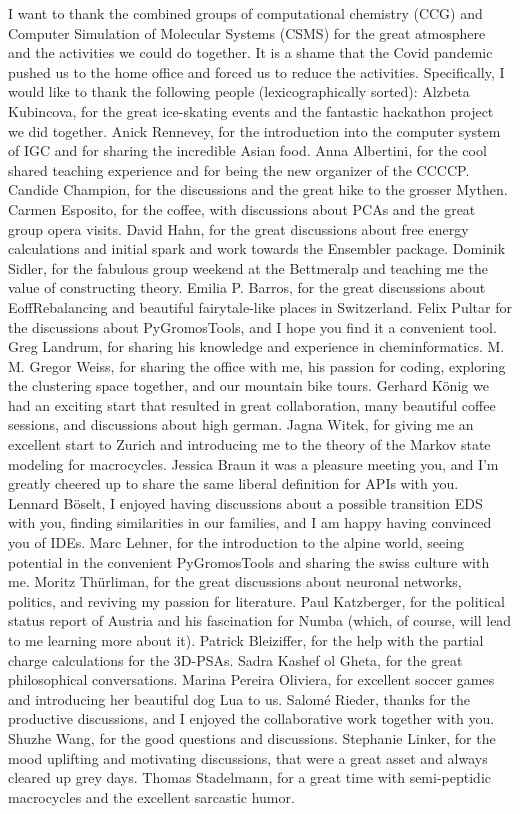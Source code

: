 I want to thank the combined groups of computational chemistry (CCG) and Computer Simulation of Molecular Systems (CSMS) for the great atmosphere and the activities we could do together. It is a shame that the Covid pandemic pushed us to the home office and forced us to reduce the activities.
Specifically, I would like to thank the following people (lexicographically sorted):
Alzbeta Kubincova, for the great ice-skating events and the fantastic hackathon project we did together.
Anick Rennevey, for the introduction into the computer system of IGC and for sharing the incredible Asian food.
Anna Albertini, for the cool shared teaching experience and for being the new organizer of the CCCCP.
Candide Champion,  for the discussions and the great hike to the grosser Mythen.
Carmen Esposito, for the coffee, with discussions about PCAs and the great group opera visits.
David Hahn, for the great discussions about free energy calculations and initial spark and work towards the Ensembler package.
Dominik Sidler, for the fabulous group weekend at the Bettmeralp and teaching me the value of constructing theory.
Emilia P. Barros, for the great discussions about EoffRebalancing and beautiful fairytale-like places in Switzerland.
Felix Pultar for the discussions about PyGromosTools, and I hope you find it a convenient tool.
Greg Landrum, for sharing his knowledge and experience in cheminformatics.
M. M. Gregor Weiss, for sharing the office with me, his passion for coding, exploring the clustering space together, and our mountain bike tours.
Gerhard K{\"o}nig we had an exciting start that resulted in great collaboration, many beautiful coffee sessions, and discussions about high german.
Jagna Witek, for giving me an excellent start to Zurich and introducing me to the theory of the Markov state modeling for macrocycles.
Jessica Braun it was a pleasure meeting you, and I'm greatly cheered up to share the same liberal definition for APIs with you.
Lennard B{\"o}selt, I enjoyed having discussions about a possible transition EDS with you, finding similarities in our families, and I am happy having convinced you of IDEs.
Marc Lehner, for the introduction to the alpine world, seeing potential in the convenient PyGromosTools and sharing the swiss culture with me.
Moritz Th{\"u}rliman, for the great discussions about neuronal networks, politics, and reviving my passion for literature.
Paul Katzberger, for the political status report of Austria and his fascination for Numba (which, of course, will lead to me learning more about it).
Patrick Bleiziffer, for the help with the partial charge calculations for the 3D-PSAs.
Sadra Kashef ol Gheta, for the great philosophical conversations.
Marina Pereira Oliviera, for excellent soccer games and introducing her beautiful dog Lua to us.
Salom{\'e} Rieder, thanks for the productive discussions, and I enjoyed the collaborative work together with you.
Shuzhe Wang, for the good questions and discussions.
Stephanie Linker, for the mood uplifting and motivating discussions, that were a great asset and always cleared up grey days.
Thomas Stadelmann, for a great time with semi-peptidic macrocycles and the excellent sarcastic humor.



